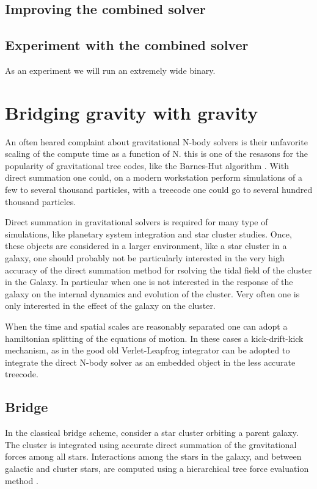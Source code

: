 \subsection{Improving the combined solver} 

\subsection{Experiment with the combined solver}

As an experiment we will run an extremely wide binary.



\section{Bridging gravity with gravity}

An often heared complaint about gravitational N-body solvers is their
unfavorite scaling of the compute time as a function of N. this is one
of the resasons for the popularity of gravitational tree codes, like
the Barnes-Hut algorithm \cite{1986Natur.324..446B}.  With direct
summation one could, on a modern workstation perform simulations of a
few to several thousand particles, with a treecode one could go to
several hundred thousand particles.

Direct summation in gravitational solvers is required for many type of
simulations, like planetary system integration and star cluster
studies. Once, these objects are considered in a larger environment,
like a star cluster in a galaxy, one should probably not be
particularly interested in the very high accuracy of the direct
summation method for rsolving the tidal field of the cluster in the
Galaxy. In particular when one is not interested in the response of
the galaxy on the internal dynamics and evolution of the cluster. Very
often one is only interested in the effect of the galaxy on the
cluster. 

When the time and spatial scales are reasonably separated one can
adopt a hamiltonian splitting of the equations of motion. In these
cases a kick-drift-kick mechanism, as in the good old Verlet-Leapfrog
integrator can be adopted to integrate the direct N-body solver as an
embedded object in the less accurate treecode.

\subsection{Bridge}

In the classical bridge scheme, \cite{2007PASJ...59.1095F} consider a
star cluster orbiting a parent galaxy.  The cluster is integrated
using accurate direct summation of the gravitational forces among all
stars.  Interactions among the stars in the galaxy, and between
galactic and cluster stars, are computed using a hierarchical tree
force evaluation method \cite{1986Natur.324..446B}.

